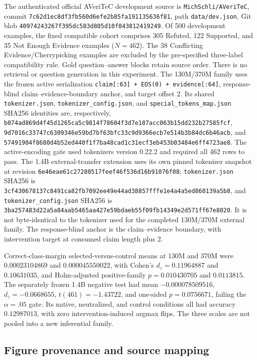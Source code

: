 The authenticated official AVeriTeC development source is
\texttt{MichSchli/AVeriTeC}, commit
\nolinkurl{7c62d1ec8df3fb560d6efe2b85fa191135636f81},
path \texttt{data/dev.json}, Git blob
\nolinkurl{40974243267f395dc583d805d10f043812419249}.
Of 500 development examples, the fixed compatible cohort comprises
305 Refuted, 122 Supported, and 35 Not Enough Evidence examples
($N=462$). The 38 Conflicting Evidence/Cherrypicking examples are
excluded by the pre-specified three-label compatibility rule.
Gold question--answer blocks retain source order. There is no retrieval
or question generation in this experiment.
The 130M/370M family uses the frozen active serialization
\texttt{claim[:63] + EOS(0) + evidence[:64]},
response-blind claim--evidence-boundary anchor, and target offset 2.
Its shared \texttt{tokenizer.json},
\texttt{tokenizer\_config.json}, and
\texttt{special\_tokens\_map.json} SHA256 identities are, respectively,
\nolinkurl{b074ad869d4f45d1265ca5c9814f78604f3d7e187acc063b15dd232b27585fcf},
\nolinkurl{9d7016c33747c6309346e59bd7bf63bfc33c9d9366ecb7e514b3b84dc6b46acb},
and \nolinkurl{57491904f8680d4b52ed440f1f7ba48cad1c31ecf3eb453b03484e6ff4723ae8}.
The active-encoding gate used tokenizers version 0.22.2 and required
all 462 rows to pass.
The 1.4B external-transfer extension uses its own pinned tokenizer
snapshot at revision
\nolinkurl{6e46eae61c27280517feef46f536d16b91076f08};
\texttt{tokenizer.json} SHA256 is
\nolinkurl{3cf430678137c8491ca82fb7092ee49e44ad38857fffe1e4a4a5ed860139a5b8},
and \texttt{tokenizer\_config.json} SHA256 is
\nolinkurl{3ba257483d22a5a84aab5465aa427e59bdaeb55f09fb14349e2d571ff67e8020}.
It is not byte-identical to the tokenizer used for the completed
130M/370M external family. The response-blind anchor is the claim--evidence
boundary, with intervention target at consumed claim length plus 2.

Correct-class-margin selected-versus-control means at 130M and 370M
were $0.00023104869$ and $0.000045550022$, with Cohen's
$d_z=0.11964887$ and $0.10631035$, and Holm-adjusted positive-family
$p=0.010430705$ and $0.0113815$. The separately frozen 1.4B
negative test had mean $-0.000078509516$, $d_z=-0.0668655$,
$t(461)=-1.43722$, and one-sided $p=0.0756671$, failing
the $\alpha=.05$ gate. Its native, neutralized, and control conditions
all had accuracy $0.12987013$, with zero intervention-induced argmax
flips. The three scales are not pooled into a new inferential family.

\subsection{Figure provenance and source mapping}
\label{app:provenance}

